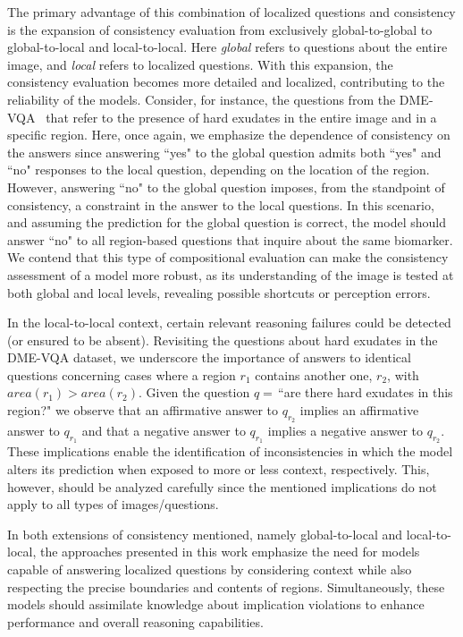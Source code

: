 The primary advantage of this combination of localized questions and consistency is the expansion of consistency evaluation from exclusively global-to-global to global-to-local and local-to-local. Here \textit{global} refers to questions about the entire image, and \textit{local} refers to localized questions. With this expansion, the consistency evaluation becomes more detailed and localized, contributing to the reliability of the models. Consider, for instance, the questions from the DME-VQA~\cite{tascon2022consistency} that refer to the presence of hard exudates in the entire image and in a specific region. Here, once again, we emphasize the dependence of consistency on the answers since answering ``yes" to the global question admits both ``yes" and ``no" responses to the local question, depending on the location of the region. However, answering ``no" to the global question imposes, from the standpoint of consistency, a constraint in the answer to the local questions. In this scenario, and assuming the prediction for the global question is correct, the model should answer ``no" to all region-based questions that inquire about the same biomarker. We contend that this type of compositional evaluation can make the consistency assessment of a model more robust, as its understanding of the image is tested at both global and local levels, revealing possible shortcuts or perception errors.

In the local-to-local context, certain relevant reasoning failures could be detected (or ensured to be absent). Revisiting the questions about hard exudates in the DME-VQA dataset, we underscore the importance of answers to identical questions concerning cases where a region $r_1$ contains another one, $r_2$, with $area(r_1)>area(r_2)$. Given the question $q = \,$``are there hard exudates in this region?" we observe that an affirmative answer to $q_{r_2}$ implies an affirmative answer to $q_{r_1}$ and that a negative answer to $q_{r_1}$ implies a negative answer to $q_{r_2}$. These implications enable the identification of inconsistencies in which the model alters its prediction when exposed to more or less context, respectively. This, however, should be analyzed carefully since the mentioned implications do not apply to all types of images/questions.

In both extensions of consistency mentioned, namely global-to-local and local-to-local, the approaches presented in this work emphasize the need for models capable of answering localized questions by considering context while also respecting the precise boundaries and contents of regions. Simultaneously, these models should assimilate knowledge about implication violations to enhance performance and overall reasoning capabilities.

